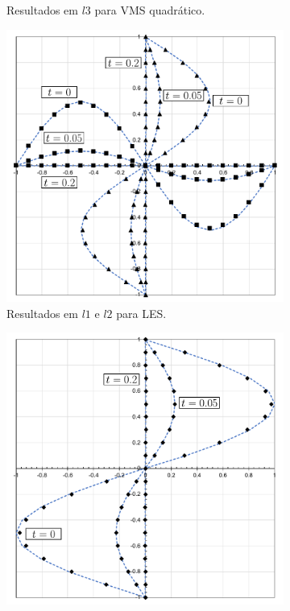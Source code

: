 \begin{figure}[h]
\begin{subfigure}{0.42\textwidth}
    \caption{Resultados em $l3$ para VMS quadrático.}
    \end{subfigure}
    \begin{subfigure}{0.42\textwidth}
    \includegraphics[width=\linewidth]{Figuras/taylor-green/LES.pdf}
    \caption{Resultados em $l1$ e $l2$ para LES.}
    \end{subfigure}
    \begin{subfigure}{0.42\textwidth}
    \includegraphics[width=\linewidth]{Figuras/taylor-green/LES-uz.pdf}

\end{subfigure}
\end{figure}
